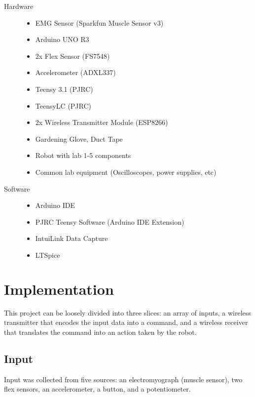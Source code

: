 \documentclass[12pt,scrartcl,titlepage]{article}
\begin{document}
\begin{description}

\item[Hardware]
  
  \begin{itemize}
  \item EMG Sensor (Sparkfun Muscle Sensor v3)
  \item Arduino UNO R3
  \item 2x Flex Sensor (FS7548)
  \item Accelerometer (ADXL337)
  \item Teensy 3.1 (PJRC)
  \item TeensyLC (PJRC)
  \item 2x Wireless Transmitter Module (ESP8266)
  \item Gardening Glove, Duct Tape
  \item Robot with lab 1-5 components
  \item Common lab equipment (Oscilloscopes, power supplies, etc)
  \end{itemize}
  
\item[Software]
  
  \begin{itemize}
  \item Arduino IDE
  \item PJRC Teensy Software (Arduino IDE Extension)
  \item IntuiLink Data Capture
  \item LTSpice
  \end{itemize}

\end{description}

\section{Implementation}

This project can be loosely divided into three slices: an array of inputs, a wireless transmitter that encodes the input data into a command, and a wireless receiver that translates the command into an action taken by the robot.

\subsection{Input}

Input was collected from five sources: an electromyograph (muscle sensor), two flex sensors, an accelerometer, a button, and a potentiometer.
\end{document}
